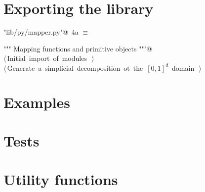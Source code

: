 \documentclass[11pt,oneside]{article}	%
\begin{document}
\section{Exporting the library}
\begin{flushleft} \small \label{scrap11}
\protect{}\verb@"lib/py/mapper.py"@\nobreak\ {\footnotesize 4a }$\equiv$
\vspace{-1ex}
\begin{list}{}{} \item
\mbox{}\verb@""" Mapping functions and primitive objects """@\\
\mbox{}\verb@@\hbox{$\langle\,$Initial import of modules\nobreak\ {\footnotesize {}}$\,\rangle$}\verb@@\\
\mbox{}\verb@@\hbox{$\langle\,$Generate a simplicial decomposition ot the $[0,1]^d$ domain\nobreak\ {\footnotesize {}}$\,\rangle$}\verb@@\\
\mbox{}\verb@@{\NWsep}
\end{list}
\vspace{-2ex}
\end{flushleft}
\section{Examples}
\section{Tests}

\appendix
\section{Utility functions}
\end{document}
